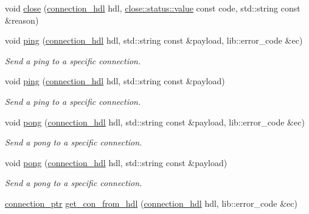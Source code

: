 \begin{DoxyCompactItemize}
\item 
void \hyperlink{classwebsocketpp_1_1endpoint_a7a4595364dc18d423ff5aa6eda41ecde}{close} (\hyperlink{namespacewebsocketpp_a6b3d26a10ee7229b84b776786332631d}{connection\+\_\+hdl} hdl, \hyperlink{namespacewebsocketpp_1_1close_1_1status_a8614a5c4733d708e2d2a32191c5bef84}{close\+::status\+::value} const code, std\+::string const \&reason)
\item 
void \hyperlink{classwebsocketpp_1_1endpoint_a1d4bcbc3fcd87f48120fbb421467f414}{ping} (\hyperlink{namespacewebsocketpp_a6b3d26a10ee7229b84b776786332631d}{connection\+\_\+hdl} hdl, std\+::string const \&payload, lib\+::error\+\_\+code \&ec)
\begin{DoxyCompactList}\small\item\em Send a ping to a specific connection. \end{DoxyCompactList}\item 
void \hyperlink{classwebsocketpp_1_1endpoint_a35267939caf4b611b01701ba13cd0b33}{ping} (\hyperlink{namespacewebsocketpp_a6b3d26a10ee7229b84b776786332631d}{connection\+\_\+hdl} hdl, std\+::string const \&payload)
\begin{DoxyCompactList}\small\item\em Send a ping to a specific connection. \end{DoxyCompactList}\item 
void \hyperlink{classwebsocketpp_1_1endpoint_a58a55e0288d4da518b2a806587df3809}{pong} (\hyperlink{namespacewebsocketpp_a6b3d26a10ee7229b84b776786332631d}{connection\+\_\+hdl} hdl, std\+::string const \&payload, lib\+::error\+\_\+code \&ec)
\begin{DoxyCompactList}\small\item\em Send a pong to a specific connection. \end{DoxyCompactList}\item 
void \hyperlink{classwebsocketpp_1_1endpoint_ab546cb4089f868a09c8d0694fb6f0be6}{pong} (\hyperlink{namespacewebsocketpp_a6b3d26a10ee7229b84b776786332631d}{connection\+\_\+hdl} hdl, std\+::string const \&payload)
\begin{DoxyCompactList}\small\item\em Send a pong to a specific connection. \end{DoxyCompactList}\item 
\hyperlink{classwebsocketpp_1_1endpoint_aa90d289d870c500be228ee1dea75b8b2}{connection\+\_\+ptr} \hyperlink{classwebsocketpp_1_1endpoint_a0fe4457427d4124abe7ca022ba7afbb4}{get\+\_\+con\+\_\+from\+\_\+hdl} (\hyperlink{namespacewebsocketpp_a6b3d26a10ee7229b84b776786332631d}{connection\+\_\+hdl} hdl, lib\+::error\+\_\+code \&ec)

\end{DoxyCompactItemize}
